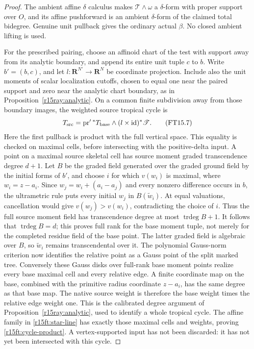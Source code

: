 \begin{proof}
The ambient affine $\delta$ calculus makes
$\mathscr T\wedge\omega$ a $\delta$-form with proper support
over $O$, and its affine pushforward is an ambient $\delta$-form
of the claimed total bidegree. Genuine unit pullback gives the
ordinary actual $\beta$. No closed ambient lifting is used.

For the prescribed pairing, choose an affinoid chart of the test
with support away from its analytic boundary, and append its
entire unit tuple $c$ to $b$. Write $b'=(b,c)$, and let
$l:\mathbf R^{N'}\to\mathbf R^N$ be coordinate projection.
Include also the unit moments of scalar localization cutoffs,
chosen to equal one near the paired support and zero near the
analytic chart boundary, as in Proposition~\ref{r15ray:analytic}.
On a common finite subdivision away from those boundary images,
the weighted source tropical cycle is
\[
 T_{\rm src}=\operatorname{pr}'{}^*T_{\rm base}\wedge
                         (l\times\mathrm{id})^*\mathscr T.
\tag{FT15.7}\label{r15ft:cycle-product}
\]
Here the first pullback is product with the full vertical space.
This equality is checked on maximal cells, before intersecting
with the positive-delta input. A point on a maximal source
skeletal cell has source moment graded transcendence degree $d+1$.
Let $B$ be the graded field generated over the graded ground field
by the initial forms of $b'$, and choose $i$ for which
$v(w_i)$ is maximal, where $w_i=z-a_i$.
Since $w_j=w_i+(a_i-a_j)$ and every nonzero difference occurs in $b$,
the ultrametric rule puts every initial $w_j$ in $B(\widetilde w_i)$.
At equal valuations, cancellation would give $v(w_j)>v(w_i)$,
contradicting the choice of $i$. Thus the full source moment field
has transcendence degree at most $\operatorname{trdeg}B+1$.
It follows that $\operatorname{trdeg}B=d$; this proves full rank
for the base moment tuple, not merely for the completed residue
field of the base point.
The latter graded field is algebraic over $B$, so
$\widetilde w_i$ remains transcendental over it. The polynomial
Gauss-norm criterion now identifies the relative point as a
Gauss point of the split marked tree.
Conversely these Gauss disks over full-rank base moment points
realize every base maximal cell and every relative edge.
A finite coordinate map on the base, combined with the primitive
radius coordinate $z-a_i$, has the same degree as that base map.
The native source weight is therefore the base weight times the
relative edge weight one. This is the calibrated degree argument
of Proposition~\ref{r15ray:analytic}, used to identify a whole tropical cycle.
The affine family in \eqref{r15ft:star-line} has exactly those
maximal cells and weights, proving \eqref{r15ft:cycle-product}.
A vertex-supported input has not been discarded: it has not yet
been intersected with this cycle.


\end{proof}
